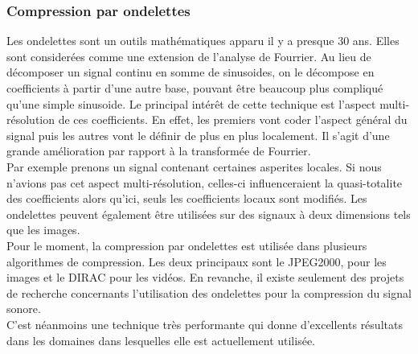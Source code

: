 \documentclass[a4paper,12pt]{article}
\begin{document}
		\subsubsection{Compression par ondelettes}
Les ondelettes sont  un outils math\'ematiques apparu il  y a presque 30
ans.  Elles  sont  consider\'ees comme  une  extension  de  l'analyse de
Fourrier.  Au  lieu  de  d\'ecomposer  un  signal  continu  en  somme de
sinusoides,  on le  d\'ecompose en coefficients  \`a partir  d'une autre
base,  pouvant \^etre beaucoup plus compliqu\'e qu'une simple sinusoide.
Le   principal    int\'er\^et   de   cette    technique   est   l'aspect
multi-r\'esolution  de ces  coefficients.  En effet,  les  premiers vont
coder l'aspect g\'en\'eral  du signal puis les autres  vont le d\'efinir
de plus en  plus localement.  Il s'agit d'une  grande am\'elioration par
rapport \`a la transform\'ee de Fourrier.\\
Par exemple prenons un signal contenant certaines asperites locales.  Si
nous   n'avions   pas    cet   aspect   multi-r\'esolution,    celles-ci
influenceraient la quasi-totalite  des coefficients alors qu'ici,  seuls
les  coefficients  locaux   sont  modifi\'es.   Les  ondelettes  peuvent
\'egalement \^etre utilis\'ees sur des  signaux \`a deux dimensions tels
que les images.\\
Pour  le  moment,  la compression  par  ondelettes  est  utilis\'ee dans
plusieurs  algorithmes  de  compression.  Les  deux  principaux  sont le
JPEG2000,  pour les images et le  DIRAC pour les vid\'eos.  En revanche,
il existe  seulement des projets de  recherche concernants l'utilisation
des ondelettes pour la compression du signal sonore.\\
C'est   n\'eanmoins  une   technique   tr\`es   performante   qui  donne
d'excellents r\'esultats  dans  les  domaines  dans  lesquelles elle est
actuellement utilis\'ee.

\newpage
\end{document}
